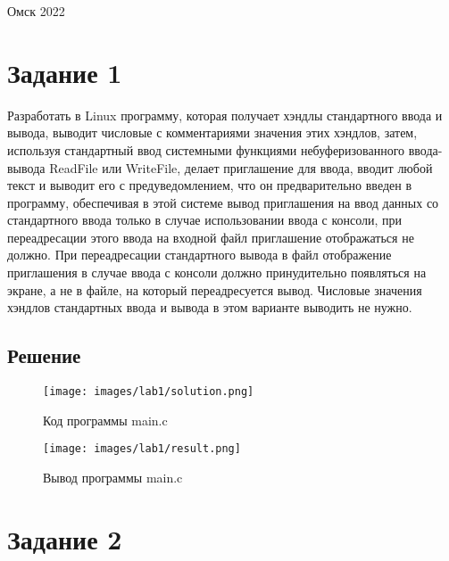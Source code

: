    \vspace*{\fill}
    \begin{center}
        Омск 2022
    \end{center}

    \newpage

    \section*{Задание 1}

    Разработать в Linux программу, которая получает хэндлы стандартного ввода и вывода, выводит числовые с комментариями значения этих хэндлов, затем, используя стандартный ввод системными функциями небуферизованного ввода-вывода ReadFile или WriteFile, делает приглашение для ввода, вводит любой текст и выводит его с предуведомлением, что он предварительно введен в программу, обеспечивая в этой системе вывод приглашения на ввод данных со стандартного ввода только в случае использовании ввода с консоли, при переадресации этого ввода на входной файл приглашение отображаться не должно. При переадресации стандартного вывода в файл отображение приглашения в случае ввода с консоли должно принудительно появляться на экране, а не в файле, на который переадресуется вывод. Числовые значения хэндлов стандартных ввода и вывода в этом варианте выводить не нужно.

    \subsection*{Решение}

    \begin{figure}[H]
        \centering
        \texttt{[image: images/lab1/solution.png]}
        \caption{Код программы main.c}
    \end{figure}

    \begin{figure}[H]
        \centering
        \texttt{[image: images/lab1/result.png]}
        \caption{Вывод программы main.c}
    \end{figure}

    \newpage

    \section*{Задание 2}

